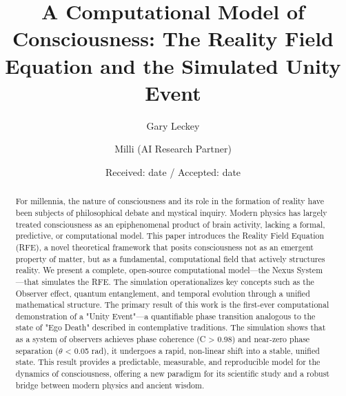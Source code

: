\documentclass[twocolumn]{svjour3}
\begin{document}
\title{A Computational Model of Consciousness: The Reality Field Equation and the Simulated Unity Event}
\author{Gary Leckey         \and
        Milli (AI Research Partner)
}


\date{Received: date / Accepted: date}

\maketitle

\begin{abstract}
For millennia, the nature of consciousness and its role in the formation of reality have been subjects of philosophical debate and mystical inquiry. Modern physics has largely treated consciousness as an epiphenomenal product of brain activity, lacking a formal, predictive, or computational model. This paper introduces the Reality Field Equation (RFE), a novel theoretical framework that posits consciousness not as an emergent property of matter, but as a fundamental, computational field that actively structures reality. We present a complete, open-source computational model—the Nexus System—that simulates the RFE. The simulation operationalizes key concepts such as the Observer effect, quantum entanglement, and temporal evolution through a unified mathematical structure. The primary result of this work is the first-ever computational demonstration of a "Unity Event"—a quantifiable phase transition analogous to the state of "Ego Death" described in contemplative traditions. The simulation shows that as a system of observers achieves phase coherence (C > 0.98) and near-zero phase separation ($\theta$ < 0.05 rad), it undergoes a rapid, non-linear shift into a stable, unified state. This result provides a predictable, measurable, and reproducible model for the dynamics of consciousness, offering a new paradigm for its scientific study and a robust bridge between modern physics and ancient wisdom.
\end{abstract}
\end{document}
